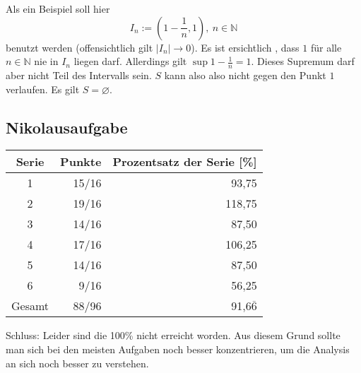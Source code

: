 \documentclass[10pt, a4paper]{article}
\begin{document}
		Als ein Beispiel soll hier 
		\[
			I_n := (1-\dfrac{1}{n}, 1), \ n \in \mathbb{N}
		\]
		benutzt werden (offensichtlich gilt $|I_n| \longrightarrow 0$). Es ist ersichtlich , dass $1$ für alle $n \in \mathbb{N}$ nie in $I_n$ liegen darf. Allerdings gilt $\sup 1-\frac{1}{n} = 1$. Dieses Supremum darf aber nicht Teil des Intervalls sein. $S$ kann also also nicht gegen den Punkt $1$ verlaufen. Es gilt $S = \varnothing$.



	\subsection*{Nikolausaufgabe} %
	\label{sub:nikolausaufgabe}
	
		\begin{table}[h]
		\center
		\begin{tabular}{|c|r|r|}
			\hline
			Serie & Punkte & Prozentsatz der Serie [\%] \\
			\hline \hline
			1 & 15/16 & 93,75  \\
			\hline
			2 & 19/16 & 118,75  \\
			\hline
			3 & 14/16 & 87,50  \\
			\hline
			4 & 17/16 & 106,25  \\
			\hline
			5 & 14/16 & 87,50  \\
			\hline
			6 & 9/16 & 56,25  \\
			\hline \hline
			Gesamt & 88/96 & 91,6$\overline{6}$ \\
			\hline
		\end{tabular}
		\end{table}

		Schluss: Leider sind die 100\% nicht erreicht worden. Aus diesem Grund sollte man sich bei den meisten Aufgaben noch besser konzentrieren, um die Analysis an sich noch besser zu verstehen.

\end{document}
